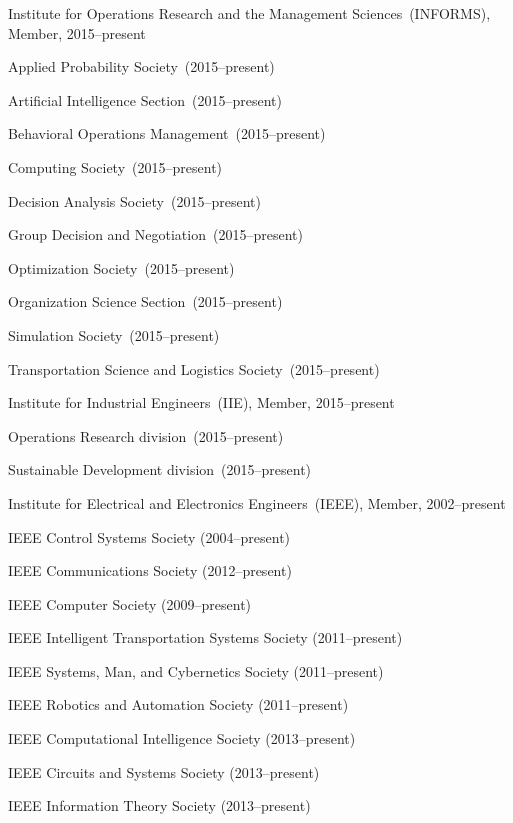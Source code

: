 \documentclass[10pt]{article}           %
\newcommand{\halfblankline}{\quad\vspace{-0.5\baselineskip}\pagebreak[3]}
\begin{document}
Institute for Operations Research and the Management Sciences~(INFORMS), Member, 2015--present
%
\begin{innerlist}
\item Applied Probability Society~(2015--present)
\item Artificial Intelligence Section~(2015--present)
\item Behavioral Operations Management~(2015--present)
\item Computing Society~(2015--present)
\item Decision Analysis Society~(2015--present)
\item Group Decision and Negotiation~(2015--present)
\item Optimization Society~(2015--present)
\item Organization Science Section~(2015--present)
\item Simulation Society~(2015--present)
\item Transportation Science and Logistics Society~(2015--present)
\end{innerlist}

\halfblankline

Institute for Industrial Engineers~(IIE), Member, 2015--present
%
\begin{innerlist}
\item Operations Research division~(2015--present)
\item Sustainable Development division~(2015--present)
\end{innerlist}

\halfblankline

Institute for Electrical and Electronics Engineers~(IEEE), Member,
2002--present
%
\begin{innerlist}
\item IEEE Control Systems Society (2004--present)
\item IEEE Communications Society (2012--present)
\item IEEE Computer Society (2009--present)
\item IEEE Intelligent Transportation Systems Society (2011--present)
\item IEEE Systems, Man, and Cybernetics Society (2011--present)
\item IEEE Robotics and Automation Society (2011--present)
\item IEEE Computational Intelligence Society (2013--present)
\item IEEE Circuits and Systems Society (2013--present)
\item IEEE Information Theory Society (2013--present)
\end{innerlist}
\end{document}
